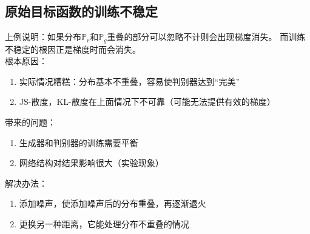 \documentclass[xelatex]{beamer}
\begin{document}
\subsection{原始目标函数的训练不稳定}
\begin{frame}
  上例说明：如果分布$\mathbb{P}_r$和$\mathbb{P}_g$重叠的部分可以忽略不计则会出现梯度消失。
  而训练不稳定的根因正是梯度时而会消失。\\
  \vspace{2mm}
  根本原因：
  \begin{enumerate}
    \item 实际情况糟糕：分布基本不重叠，容易使判别器达到“完美”
    \item JS-散度，KL-散度在上面情况下不可靠（可能无法提供有效的梯度）
  \end{enumerate}
  \vspace{2mm}
  带来的问题：
  \begin{enumerate}
    \item 生成器和判别器的训练需要平衡
    \item 网络结构对结果影响很大（实验现象）
  \end{enumerate}
  解决办法：
  \begin{enumerate}
    \item 添加噪声，使添加噪声后的分布重叠，再逐渐退火
    \item 更换另一种距离，它能处理分布不重叠的情况
  \end{enumerate}
\end{frame}

\end{document}
